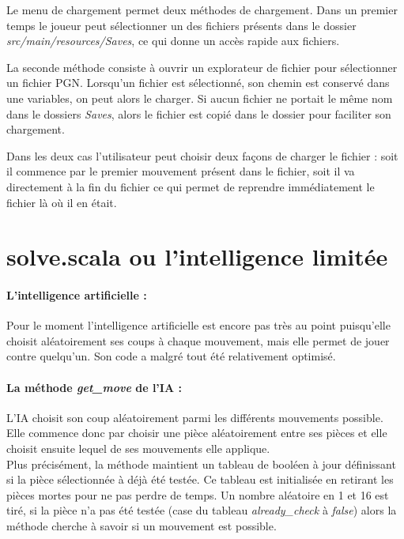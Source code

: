 \documentclass[a4paper]{article}
\begin{document}
Le menu de chargement permet deux méthodes de chargement. Dans un premier temps le joueur peut sélectionner un des fichiers présents dans le dossier \textit{src/main/resources/Saves}, ce qui donne un accès rapide aux fichiers. 

La seconde méthode consiste à ouvrir un explorateur de fichier pour sélectionner un fichier PGN. Lorsqu'un fichier est sélectionné, son chemin est conservé dans une variables, on peut alors le charger. Si aucun fichier ne portait le même nom dans le dossiers \textit{Saves}, alors le fichier est copié dans le dossier pour faciliter son chargement. 

Dans les deux cas l'utilisateur peut choisir deux façons de charger le fichier : soit il commence par le premier mouvement présent dans le fichier, soit il va directement à la fin du fichier ce qui permet de reprendre immédiatement le fichier là où il en était. 

\section{solve.scala ou l'intelligence limitée}

\paragraph{L'intelligence artificielle :}Pour le moment l'intelligence artificielle est encore pas très au point puisqu'elle choisit aléatoirement ses coups à chaque mouvement, mais elle permet de jouer contre quelqu'un. Son code a malgré tout été relativement optimisé. 

\paragraph{La méthode \textit{get\_move} de l'IA :}L'IA choisit son coup aléatoirement parmi les différents mouvements possible. Elle commence donc par choisir une pièce aléatoirement entre ses pièces et elle choisit ensuite lequel de ses mouvements elle applique. \\ 

Plus précisément, la méthode maintient un tableau de booléen à jour définissant si la pièce sélectionnée à déjà été testée. Ce tableau est initialisée en retirant les pièces mortes pour ne pas perdre de temps. Un nombre aléatoire en 1 et 16 est tiré, si la pièce n'a pas été testée (case du tableau \textit{already\_check} à \textit{false}) alors la méthode cherche à savoir si un mouvement est possible. \\
\end{document}
